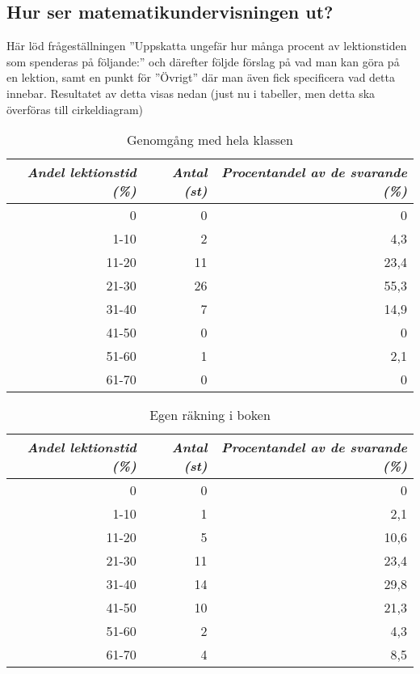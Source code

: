 \subsection{Hur ser matematikundervisningen ut?}

\textcolor{lila}{Här löd frågeställningen ''Uppskatta ungefär hur många procent av lektionstiden som spenderas på följande:'' och därefter följde förslag på vad man kan göra på en lektion, samt en punkt för ''Övrigt'' där man även fick specificera vad detta innebar. Resultatet av detta visas nedan (just nu i tabeller, men detta ska överföras till cirkeldiagram)}

\begin{table}
\caption{Genomgång med hela klassen}
\centering
\begin{tabular}{||r|r|r||} \hline\hline
\emph{Andel lektionstid (\%)} & \emph{Antal (st)} & \emph{Procentandel av de svarande (\%)} \\ \hline
\hline
0 & 0 & 0 \\ \hline
1-10 & 2 & 4,3 \\ \hline
11-20 & 11 & 23,4 \\ \hline
21-30 & 26 & 55,3 \\ \hline
31-40 & 7 & 14,9 \\ \hline
41-50 & 0 & 0 \\ \hline
51-60 & 1 & 2,1 \\ \hline
61-70 & 0 & 0 \\ \hline\hline
\end{tabular}
\label{table:Genomgang}
\end{table}


\begin{table}
\caption{Egen räkning i boken}
\centering
\begin{tabular}{||r|r|r||} \hline\hline
\emph{Andel lektionstid (\%)} & \emph{Antal (st)} & \emph{Procentandel av de svarande (\%)} \\ \hline
\hline
0 & 0 & 0 \\ \hline
1-10 & 1 & 2,1 \\ \hline
11-20 & 5 & 10,6 \\ \hline
21-30 & 11 & 23,4 \\ \hline
31-40 & 14 & 29,8 \\ \hline
41-50 & 10 & 21,3 \\ \hline
51-60 & 2 & 4,3 \\ \hline
61-70 & 4 & 8,5 \\ \hline\hline
\end{tabular}
\label{table:Rakning}
\end{table}

